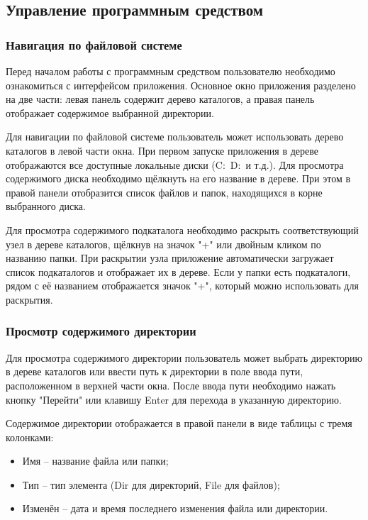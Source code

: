 \subsection{Управление программным средством}

\subsubsection{Навигация по файловой системе}

Перед началом работы с программным средством пользователю необходимо ознакомиться с интерфейсом приложения. Основное окно приложения разделено на две части: левая панель содержит дерево каталогов, а правая панель отображает содержимое выбранной директории.

Для навигации по файловой системе пользователь может использовать дерево каталогов в левой части окна. При первом запуске приложения в дереве отображаются все доступные локальные диски (C:\, D:\, и т.д.). Для просмотра содержимого диска необходимо щёлкнуть на его название в дереве. При этом в правой панели отобразится список файлов и папок, находящихся в корне выбранного диска.

Для просмотра содержимого подкаталога необходимо раскрыть соответствующий узел в дереве каталогов, щёлкнув на значок "+" или двойным кликом по названию папки. При раскрытии узла приложение автоматически загружает список подкаталогов и отображает их в дереве. Если у папки есть подкаталоги, рядом с её названием отображается значок "+", который можно использовать для раскрытия.

\subsubsection{Просмотр содержимого директории}

Для просмотра содержимого директории пользователь может выбрать директорию в дереве каталогов или ввести путь к директории в поле ввода пути, расположенном в верхней части окна. После ввода пути необходимо нажать кнопку "Перейти" или клавишу Enter для перехода в указанную директорию.

Содержимое директории отображается в правой панели в виде таблицы с тремя колонками:
\begin{itemize}
    \item Имя -- название файла или папки;
    \item Тип -- тип элемента (Dir для директорий, File для файлов);
    \item Изменён -- дата и время последнего изменения файла или директории.
\end{itemize}

